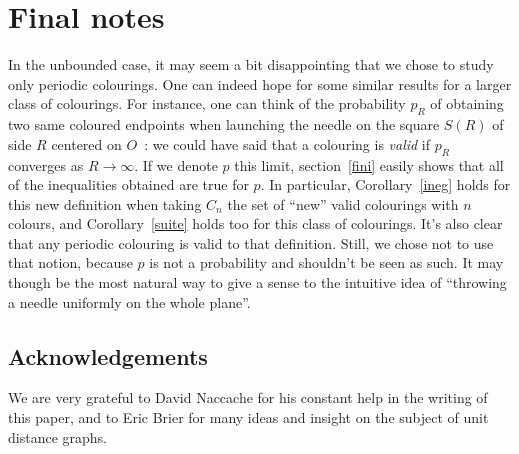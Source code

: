 \documentclass[a4paper,11pt]{article}
\theoremstyle{definition}
\theoremstyle{remark}
\begin{document}
\section{Final notes}
In the unbounded case, it may seem a bit disappointing that we chose to study 
only periodic colourings. One can indeed hope for some similar results for a 
larger class of colourings. For instance, one can think of the probability $p_R$ 
of obtaining two same coloured endpoints when launching the needle on the square 
$S(R)$ of side $R$ centered on $O$~: we could have said that a colouring is 
\emph{valid} if $p_R$ converges 
as $R \rightarrow \infty$. If we denote $p$ this limit, section~\ref{fini} 
easily shows that all of the inequalities obtained are true for $p$. In 
particular, Corollary~\ref{ineg} holds for this new definition when taking $C_n$ 
the set of ``new'' valid colourings with $n$ colours, and Corollary~\ref{suite} 
holds too for this class of colourings. 
It's also clear that any periodic colouring is valid to that 
definition. Still, we chose not to use that notion, because $p$ is not a 
probability and shouldn't be 
seen as such. It may though be the most natural way to give a sense to 
the intuitive idea of ``throwing a needle uniformly on the whole plane''.

\subsection*{Acknowledgements}
We are very grateful to David Naccache for his constant help in the writing of
this paper, and to Eric Brier for many ideas and insight on the subject of 
unit distance graphs.



\end{document}
